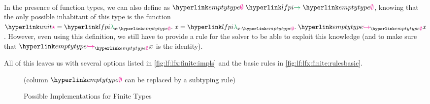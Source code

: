 \paragraph{} In the presence of function types, we can also define \unit as $\lfarrow\emptytype\emptytype$, knowing that the only possible inhabitant of this type is the function $\unite=\lflambda{x:\emptytype}x=\lflambda{x:\emptytype}{\finel x\emptytype}$. However, even using this definition, we still have to provide a rule for the solver to be able to exploit this knowledge (and to make sure that $\finel x\emptytype$ is the identity).

All of this leaves us with several options listed in \autoref{fig:lf:lfx:finite:impls} and the basic rules in \autoref{fig:lf:lfx:finite:rulesbasic}.

\begin{figure}[ht]\centering
{}
(column $\emptytype$ can be replaced by a subtyping rule)
	\caption{Possible Implementations for Finite Types}\label{fig:lf:lfx:finite:impls}
\end{figure}

